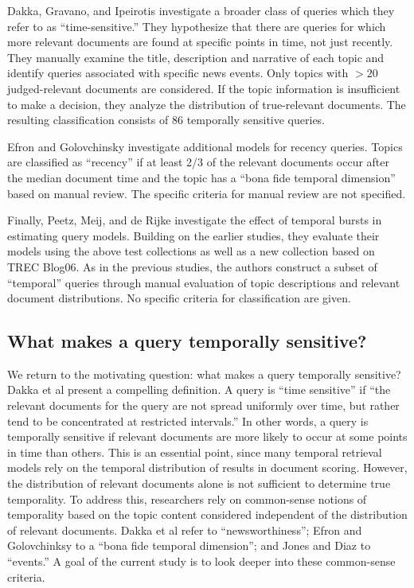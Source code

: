 \documentclass[runningheads,a4paper]{llncs}
\begin{document}
Dakka, Gravano, and Ipeirotis  \cite{Dakka2012} investigate a broader class of queries which they refer to as ``time-sensitive.'' They hypothesize that there are queries for which more relevant documents are found at specific points in time, not just recently. They manually examine the title, description and narrative of each topic and identify queries associated with specific news events. Only topics with $>20$ judged-relevant documents are considered. If the topic information is insufficient to make a decision, they analyze the distribution of true-relevant documents. The resulting classification consists of 86 temporally sensitive queries. 

Efron and Golovchinsky \cite{Efron2011} investigate additional models for recency queries.  Topics are classified as ``recency'' if at least 2/3 of the relevant documents occur after the median document time and the topic has a ``bona fide temporal dimension'' based on manual review. The specific criteria for manual review are not specified.  

Finally, Peetz, Meij, and de Rijke \cite{Peetz2013a} investigate the effect of temporal bursts in estimating query models. Building on the earlier studies, they evaluate their models using the above test collections as well as a new collection based on TREC Blog06. As in the previous studies, the authors construct a subset of ``temporal'' queries through manual evaluation of topic descriptions and relevant document distributions. No specific criteria for classification are given.

\subsection{What makes a query temporally sensitive?}

We return to the motivating question: what makes a query temporally sensitive? Dakka et al \cite{Dakka2012} present a compelling definition. A query is ``time sensitive''  if  ``the relevant documents for the query are not spread uniformly over time, but rather tend to be concentrated at restricted intervals.''  In other words, a query is temporally sensitive if relevant documents are more likely to occur at some points in time than others. This is an essential point, since many temporal retrieval models rely on the temporal distribution of results in document scoring. However, the distribution of relevant documents alone is not sufficient to determine true temporality. To address this, researchers rely on common-sense notions of temporality based on the topic content considered independent of the distribution of relevant documents. Dakka et al refer to ``newsworthiness''; Efron and Golovchinksy to a ``bona fide temporal dimension''; and Jones and Diaz to ``events.''  A goal of the current study is to look deeper into these common-sense criteria.
\end{document}
